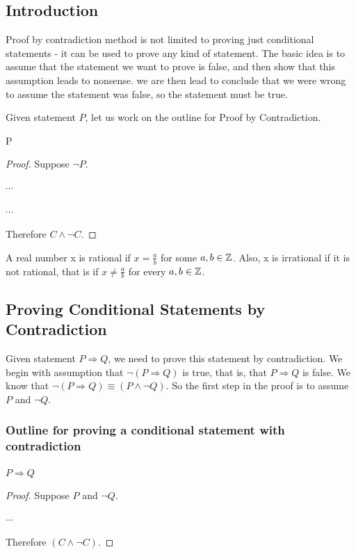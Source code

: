 \subsection{Introduction}
Proof by contradiction method is not limited to proving just conditional statements - it can be used to prove any kind of statement. 
The basic idea is to assume that the statement we want to prove is false, and then show that this assumption leads to nonsense. 
we are then lead to conclude that we were wrong to assume the statement was false, so the statement must be true. 

Given statement $P$, let us work on the outline for Proof by Contradiction. 
\begin{proposition}
    P
\end{proposition}
\begin{proof}
    Suppose $\neg P$. 

    $\cdots$

    $\cdots$

    Therefore $C \wedge \neg C$.
\end{proof}

\begin{definition}
    A real number x is rational if $x = \tfrac{a}{b}$ for some $a, b \in \mathbb{Z}$.
    Also, x is irrational if it is not rational, that is if $x \neq \tfrac{a}{b}$ for every $a, b \in \mathbb{Z}$.
\end{definition}

\subsection{Proving Conditional Statements by Contradiction}
Given statement $P \Rightarrow Q$, we need to prove this statement by contradiction. 
We begin with assumption that $\neg \left(P \Rightarrow Q\right)$ is true, that is, that $P \Rightarrow Q$ is false. 
We know that $\neg (P \Rightarrow Q) \equiv (P \wedge \neg Q)$. So the first step in the proof is to assume $P$ and $\neg Q$. 

\subsubsection*{Outline for proving a conditional statement with contradiction}
\begin{proposition}
    $P \Rightarrow Q$
\end{proposition}
\begin{proof}
    Suppose $P$ and $\neg Q$.

    $\cdots$

    Therefore $(C \wedge \neg C)$.
\end{proof}